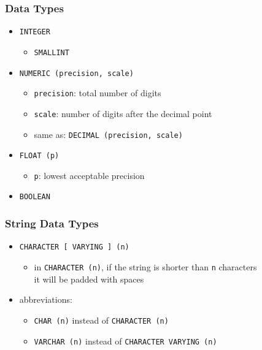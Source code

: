 \documentclass[dvipsnames]{beamer}
\theoremstyle{plain}
\begin{document}
\begin{frame}
  \frametitle{Data Types}

  \begin{itemize}
    \item \texttt{INTEGER}
    \begin{itemize}
      \item \texttt{SMALLINT}
    \end{itemize}

    \medskip
    \item \texttt{NUMERIC (precision, scale)}
    \begin{itemize}
      \item \texttt{precision}: total number of digits
      \item \texttt{scale}: number of digits after the decimal point
      \item same as: \texttt{DECIMAL (precision, scale)}
    \end{itemize}

    \medskip
    \item \texttt{FLOAT (p)}
    \begin{itemize}
      \item \texttt{p}: lowest acceptable precision
    \end{itemize}

    \medskip
    \item \texttt{BOOLEAN}
  \end{itemize}
\end{frame}

\begin{frame}
  \frametitle{String Data Types}

  \begin{itemize}
    \item \texttt{CHARACTER [ VARYING ] (n)}
    \begin{itemize}
      \item in \texttt{CHARACTER (n)}, if the string is shorter than
        \texttt{n} characters\\
        it will be padded with spaces
    \end{itemize}

    \item abbreviations:
    \begin{itemize}
      \item \texttt{CHAR (n)} instead of \texttt{CHARACTER (n)}
      \item \texttt{VARCHAR (n)} instead of \texttt{CHARACTER VARYING (n)}
    \end{itemize}
  \end{itemize}
\end{frame}
\end{document}

